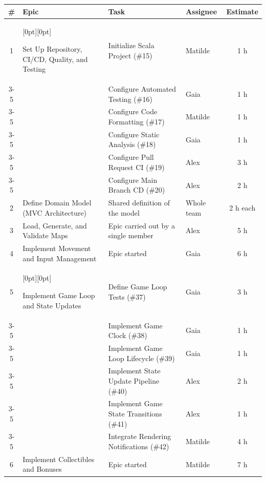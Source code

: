 \begin{center}
  \small
  \begin{tabular}{|c|p{3.5cm}|p{5.0cm}|p{2.3cm}|c|}
    \hline
    \textbf{\#} & \textbf{Epic} & \textbf{Task} & \textbf{Assignee} & \textbf{Estimate} \\
    \hline
    1 & \raisebox{0pt}[0pt][0pt]{\parbox[t]{3.5cm}{Set Up Repository, CI/CD, Quality, and Testing}} & Initialize Scala Project (\#15) & Matilde & 1 h \\
    \cline{3-5}
      &  & Configure Automated Testing (\#16) & Gaia & 1 h \\
    \cline{3-5}
      &  & Configure Code Formatting (\#17) & Matilde & 1 h \\
    \cline{3-5}
      &  & Configure Static Analysis (\#18) & Gaia & 1 h \\
    \cline{3-5}
      &  & Configure Pull Request CI (\#19) & Alex & 3 h \\
    \cline{3-5}
      &  & Configure Main Branch CD (\#20) & Alex & 2 h \\
    \hline
    2 & Define Domain Model (MVC Architecture) & Shared definition of the model & Whole team & 2 h each \\
    \hline
    3 & Load, Generate, and Validate Maps & Epic carried out by a single member & Alex & 5 h \\
    \hline
    4 & Implement Movement and Input Management & Epic started & Gaia & 6 h \\
    \hline
    5 & \raisebox{0pt}[0pt][0pt]{\parbox[t]{3.5cm}{Implement Game Loop and State Updates}} & Define Game Loop Tests (\#37) & Gaia & 3 h \\
    \cline{3-5}
      &  & Implement Game Clock (\#38) & Gaia & 1 h \\
    \cline{3-5}
      &  & Implement Game Loop Lifecycle (\#39) & Gaia & 1 h \\
    \cline{3-5}
      &  & Implement State Update Pipeline (\#40) & Alex & 2 h \\
    \cline{3-5}
      &  & Implement Game State Transitions (\#41) & Alex & 1 h \\
    \cline{3-5}
      &  & Integrate Rendering Notifications (\#42) & Matilde & 4 h \\
    \hline
    6 & Implement Collectibles and Bonuses & Epic started & Matilde & 7 h \\
    \hline
  \end{tabular}
\end{center}

